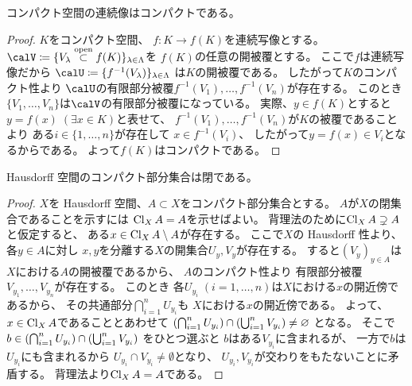 \documentclass[report]{jlreq}
\begin{document}
\begin{lemma}
    コンパクト空間の連続像はコンパクトである。
\end{lemma}

\begin{proof}
    $K$をコンパクト空間、
    $f \colon K \to f(K)$を連続写像とする。
    $\calV \coloneqq \{ V_\lambda \opensubset f(K) \}_{\lambda \in \Lambda}$を
    $f(K)$の任意の開被覆とする。
    ここで$f$は連続写像だから
    $\calU \coloneqq \{ f^{-1}(V_\lambda) \}_{\lambda \in \Lambda}$
    は$K$の開被覆である。
    したがって$K$のコンパクト性より
    $\calU$の有限部分被覆$f^{-1}(V_1), \dots, f^{-1}(V_n)$が存在する。
    このとき$\{ V_1, \dots, V_n \}$は$\calV$の有限部分被覆になっている。
    実際、$y \in f(K)$とすると
    $y = f(x) \; (\exists x \in K)$と表せて、
    $f^{-1}(V_1), \dots, f^{-1}(V_n)$が$K$の被覆であることより
    ある$i \in \{ 1, \dots, n \}$が存在して
    $x \in f^{-1}(V_i)$、
    したがって$y = f(x) \in V_i$となるからである。
    よって$f(K)$はコンパクトである。
\end{proof}

\begin{lemma}
    Hausdorff 空間のコンパクト部分集合は閉である。
\end{lemma}

\begin{proof}
    $X$を Hausdorff 空間、$A \subset X$をコンパクト部分集合とする。
    $A$が$X$の閉集合であることを示すには
    $\operatorname{Cl}_X A = A$を示せばよい。
    背理法のために$\operatorname{Cl}_X A \supsetneq A$と仮定すると、
    ある$x \in \operatorname{Cl}_X A \setminus A$が存在する。
    ここで$X$の Hausdorff 性より、
    各$y \in A$に対し
    $x, y$を分離する$X$の開集合$U_y, V_y$が存在する。
    すると$(V_y)_{y \in A}$は$X$における$A$の開被覆であるから、
    $A$のコンパクト性より
    有限部分被覆$V_{y_1}, \dots, V_{y_n}$が存在する。
    このとき
    各$U_{y_i} \; (i = 1, \dots, n)$は$X$における$x$の開近傍であるから、
    その共通部分$\bigcap_{i = 1}^n U_{y_i}$も
    $X$における$x$の開近傍である。
    よって、$x \in \operatorname{Cl}_X A$であることとあわせて
    $\left({ \bigcap_{i = 1}^n U_{y_i} }\right)
        \cap \left({\bigcup_{i = 1}^n V_{y_i}}\right)
        \neq \varnothing$
    となる。
    そこで$b \in \left({ \bigcap_{i = 1}^n U_{y_i} }\right)
        \cap \left({\bigcup_{i = 1}^n V_{y_i}}\right)$
    をひとつ選ぶと
    $b$はある$V_{y_i}$に含まれるが、
    一方で$b$は$U_{y_i}$にも含まれるから
    $U_{y_i} \cap V_{y_i} \neq \emptyset$となり、
    $U_{y_i}, V_{y_i}$が交わりをもたないことに矛盾する。
    背理法より$\operatorname{Cl}_X A = A$である。
\end{proof}
\end{document}
